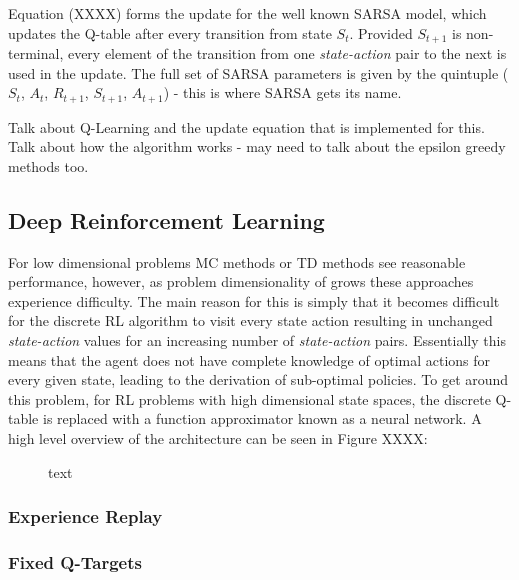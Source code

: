 \documentclass[a4paper]{article}
\begin{document}
Equation (XXXX) forms the update for the well known SARSA model, which updates the Q-table after every transition from state $S_t$. Provided $S_{t+1}$ is non-terminal, every element of the transition from one \textit{state-action} pair to the next is used in the update. The full set of SARSA parameters is given by the quintuple ($S_t$, $A_t$, $R_{t+1}$, $S_{t+1}$, $A_{t+1}$) - this is where SARSA gets its name.

Talk about Q-Learning and the update equation that is implemented for this. Talk about how the algorithm works - may need to talk about the epsilon greedy methods too.

\subsection{Deep Reinforcement Learning}
For low dimensional problems MC methods or TD methods see reasonable performance, however, as problem dimensionality of grows these approaches experience difficulty. The main reason for this is simply that it becomes difficult for the discrete RL algorithm to visit every state action resulting in unchanged \textit{state-action} values for an increasing number of \textit{state-action} pairs. Essentially this means that the agent does not have complete knowledge of optimal actions for every given state, leading to the derivation of sub-optimal policies. To get around this problem, for RL problems with high dimensional state spaces, the discrete Q-table is replaced with a function approximator known as a neural network. A high level overview of the architecture can be seen in Figure XXXX:
\begin{figure}
\centering
\caption{text}
\end{figure}



\subsubsection{Experience Replay}
\subsubsection{Fixed Q-Targets}

\newpage
\end{document}
